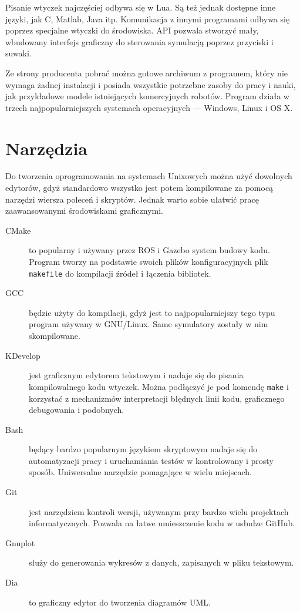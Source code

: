 	Pisanie wtyczek najczęściej odbywa się w Lua. Są też jednak dostępne inne języki, jak C, Matlab, Java itp.
	Komunikacja z innymi programami odbywa się poprzez specjalne wtyczki do środowiska.
	API pozwala stworzyć mały, wbudowany interfejs graficzny do sterowania symulacją poprzez przyciski i suwaki.

	Ze strony producenta pobrać można gotowe archiwum z programem, który nie wymaga żadnej instalacji i posiada wszystkie potrzebne zasoby do pracy i nauki, 
	jak przykładowe modele istniejących komercyjnych robotów.
	Program działa w trzech najpopularniejszych systemach operacyjnych --- Windows, Linux i OS X.

\section{Narzędzia}
	Do tworzenia oprogramowania na systemach Unixowych można użyć dowolnych edytorów, gdyż standardowo wszystko jest potem kompilowane za pomocą narzędzi wiersza poleceń i skryptów.
	Jednak warto sobie ułatwić pracę zaawansowanymi środowiskami graficznymi.
	\begin{description}
	\item[CMake] to popularny i używany przez ROS i Gazebo system budowy kodu. Program tworzy na podstawie swoich plików konfiguracyjnych plik \texttt{makefile} do kompilacji źródeł i łączenia bibliotek.
	\item[GCC] będzie użyty do kompilacji, gdyż jest to najpopularniejszy tego typu program używany w GNU/Linux. Same symulatory zostały w nim skompilowane.
	\item[KDevelop] jest graficznym edytorem tekstowym i nadaje się do pisania kompilowalnego kodu wtyczek. Można podłączyć je pod komendę \texttt{make} i korzystać z mechanizmów interpretacji błędnych linii kodu, graficznego debugowania i podobnych.
	\item[Bash] będący bardzo popularnym językiem skryptowym nadaje się do automatyzacji pracy i uruchamiania testów w kontrolowany i prosty sposób.
	Uniwersalne narzędzie pomagające w wielu miejscach.
	\item[Git] jest narzędziem kontroli wersji, używanym przy bardzo wielu projektach informatycznych. Pozwala na łatwe umieszczenie kodu w usłudze GitHub.
	\item[Gnuplot] służy do generowania wykresów z danych, zapisanych w pliku tekstowym.
	\item[Dia] to graficzny edytor do tworzenia diagramów UML.
	\end{description}


